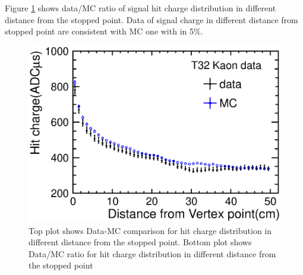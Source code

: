 
Figure \ref{RangeVsHitRatio_hough} shows data/MC ratio of signal hit charge distribution in different distance from the stopped point.
Data of signal charge in different distance from stopped point are consistent with MC one with in 5$\%$.

\begin{figure}[htb]
  \begin{center}
    \includegraphics[width=1.0\hsize]{fig/RangeVsHitfabs_wcut_hough.eps}
  \end{center}
  \caption{Top plot shows Data-MC comparison for hit charge distribution in different distance from the stopped point.
    Bottom plot shows Data/MC ratio for hit charge distribution in different distance from the stopped point}
  \label{RangeVsHitfabs_hough}
  \label{RangeVsHitRatio_hough}
\end{figure}




